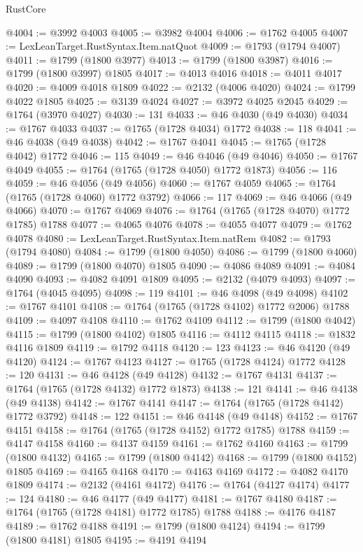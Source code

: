 \begin{lexlean}{RustCore}
\begin{coremodule}
@4004 := @3992 @4003
@4005 := @3982 @4004
@4006 := @1762 @4005
@4007 := LexLeanTarget.RustSyntax.Item.natQuot
@4009 := @1793 (@1794 @4007)
@4011 := @1799 (@1800 @3977)
@4013 := @1799 (@1800 @3987)
@4016 := @1799 (@1800 @3997) @1805
@4017 := @4013 @4016
@4018 := @4011 @4017
@4020 := @4009 @4018 @1809
@4022 := @2132 (@4006 @4020)
@4024 := @1799 @4022 @1805
@4025 := @3139 @4024
@4027 := @3972 @4025 @2045
@4029 := @1764 (@3970 @4027)
@4030 := 131
@4033 := @46 @4030 (@49 @4030)
@4034 := @1767 @4033
@4037 := @1765 (@1728 @4034) @1772
@4038 := 118
@4041 := @46 @4038 (@49 @4038)
@4042 := @1767 @4041
@4045 := @1765 (@1728 @4042) @1772
@4046 := 115
@4049 := @46 @4046 (@49 @4046)
@4050 := @1767 @4049
@4055 := @1764 (@1765 (@1728 @4050) @1772 @1873)
@4056 := 116
@4059 := @46 @4056 (@49 @4056)
@4060 := @1767 @4059
@4065 := @1764 (@1765 (@1728 @4060) @1772 @3792)
@4066 := 117
@4069 := @46 @4066 (@49 @4066)
@4070 := @1767 @4069
@4076 := @1764 (@1765 (@1728 @4070) @1772 @1785) @1788
@4077 := @4065 @4076
@4078 := @4055 @4077
@4079 := @1762 @4078
@4080 := LexLeanTarget.RustSyntax.Item.natRem
@4082 := @1793 (@1794 @4080)
@4084 := @1799 (@1800 @4050)
@4086 := @1799 (@1800 @4060)
@4089 := @1799 (@1800 @4070) @1805
@4090 := @4086 @4089
@4091 := @4084 @4090
@4093 := @4082 @4091 @1809
@4095 := @2132 (@4079 @4093)
@4097 := @1764 (@4045 @4095)
@4098 := 119
@4101 := @46 @4098 (@49 @4098)
@4102 := @1767 @4101
@4108 := @1764 (@1765 (@1728 @4102) @1772 @2006) @1788
@4109 := @4097 @4108
@4110 := @1762 @4109
@4112 := @1799 (@1800 @4042)
@4115 := @1799 (@1800 @4102) @1805
@4116 := @4112 @4115
@4118 := @1832 @4116 @1809
@4119 := @1792 @4118
@4120 := 123
@4123 := @46 @4120 (@49 @4120)
@4124 := @1767 @4123
@4127 := @1765 (@1728 @4124) @1772
@4128 := 120
@4131 := @46 @4128 (@49 @4128)
@4132 := @1767 @4131
@4137 := @1764 (@1765 (@1728 @4132) @1772 @1873)
@4138 := 121
@4141 := @46 @4138 (@49 @4138)
@4142 := @1767 @4141
@4147 := @1764 (@1765 (@1728 @4142) @1772 @3792)
@4148 := 122
@4151 := @46 @4148 (@49 @4148)
@4152 := @1767 @4151
@4158 := @1764 (@1765 (@1728 @4152) @1772 @1785) @1788
@4159 := @4147 @4158
@4160 := @4137 @4159
@4161 := @1762 @4160
@4163 := @1799 (@1800 @4132)
@4165 := @1799 (@1800 @4142)
@4168 := @1799 (@1800 @4152) @1805
@4169 := @4165 @4168
@4170 := @4163 @4169
@4172 := @4082 @4170 @1809
@4174 := @2132 (@4161 @4172)
@4176 := @1764 (@4127 @4174)
@4177 := 124
@4180 := @46 @4177 (@49 @4177)
@4181 := @1767 @4180
@4187 := @1764 (@1765 (@1728 @4181) @1772 @1785) @1788
@4188 := @4176 @4187
@4189 := @1762 @4188
@4191 := @1799 (@1800 @4124)
@4194 := @1799 (@1800 @4181) @1805
@4195 := @4191 @4194

\end{coremodule}
\end{lexlean}
